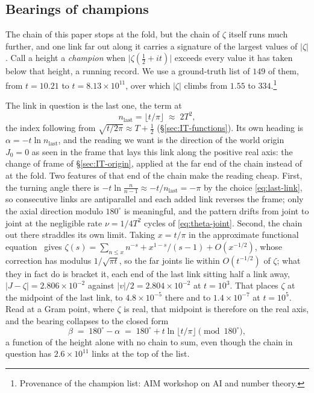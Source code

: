 \documentclass[11pt]{article}
\theoremstyle{definition}
\begin{document}
\subsection{Bearings of champions}\label{sec:champion-bearings}

The chain of this paper stops at the fold, but the chain of $\zeta$ itself runs
much further, and one link far out along it carries a signature of the largest
values of $|\zeta|$. Call a height a \emph{champion} when
$\bigl|\zeta(\tfrac12+it)\bigr|$ exceeds every value it has taken below that
height, a running record. We use a ground-truth list of $149$ of them, from
$t=10.21$ to $t=8.13\times10^{11}$, over which $|\zeta|$ climbs from $1.55$ to
$334$.\footnote{Provenance of the champion list: AIM workshop on AI and
number theory.}

The link in question is the last one, the term at
\begin{equation}\label{eq:last-link}
n_{\text{last}}=\lfloor t/\pi\rfloor\;\approx\;2T^{2},
\end{equation}
the index following from $\sqrt{t/2\pi}\approx T+\tfrac12$
(\S\ref{sec:IT-functions}). Its own
heading is $\alpha=-t\ln n_{\text{last}}$, and the reading we want is the
direction of the world origin $J_{0}=0$ as seen in the frame that lays this link
along the positive real axis: the change of frame of
\S\ref{sec:IT-origin}, applied at the far end of the chain instead of at the
fold. Two features of that end of the chain make the reading cheap. First, the
turning angle there is $-t\ln\frac{n}{n-1}\approx-t/n_{\text{last}}=-\pi$ by the
choice \eqref{eq:last-link}, so consecutive links are antiparallel and each added
link reverses the frame; only the axial direction modulo $180^{\circ}$ is
meaningful, and the pattern drifts from joint to joint at the negligible rate
$\nu=1/4T^{2}$ cycles of \eqref{eq:theta-joint}. Second, the chain out there
straddles its own limit. Taking $x=t/\pi$ in the approximate functional
equation~\cite[Thm.~4.11]{Titchmarsh1986} gives
$\zeta(s)=\sum_{n\leq x}n^{-s}+x^{1-s}/(s-1)+O(x^{-1/2})$, whose correction has
modulus $1/\sqrt{\pi t}$, so the far joints lie within $O(t^{-1/2})$ of $\zeta$;
what they in fact do is bracket it, each end of the last link sitting half a link
away, $|J-\zeta|=2.806\times10^{-2}$ against $|v|/2=2.804\times10^{-2}$ at
$t=10^{3}$. That places $\zeta$ at the midpoint of the last link, to
$4.8\times10^{-5}$ there and to $1.4\times10^{-7}$ at $t=10^{5}$. Read at a Gram
point, where $\zeta$ is real, that midpoint is therefore on the real axis, and the
bearing collapses to the closed form
\begin{equation}\label{eq:bearing}
\beta\;=\;180^{\circ}-\alpha\;=\;180^{\circ}+t\ln\lfloor t/\pi\rfloor
\pmod{180^{\circ}},
\end{equation}
a function of the height alone with no chain to sum, even though the chain in
question has $2.6\times10^{11}$ links at the top of the list.
\end{document}
